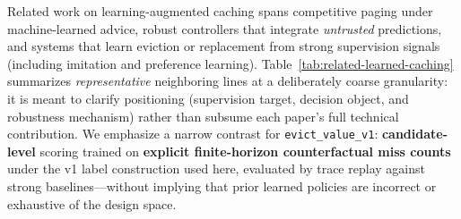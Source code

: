 Related work on learning-augmented caching spans competitive paging under machine-learned advice, robust controllers that integrate \emph{untrusted} predictions, and systems that learn eviction or replacement from strong supervision signals (including imitation and preference learning).
Table~\ref{tab:related-learned-caching} summarizes \emph{representative} neighboring lines at a deliberately coarse granularity: it is meant to clarify positioning (supervision target, decision object, and robustness mechanism) rather than subsume each paper's full technical contribution.
We emphasize a narrow contrast for \texttt{evict\_value\_v1}: \textbf{candidate-level} scoring trained on \textbf{explicit finite-horizon counterfactual miss counts} under the v1 label construction used here, evaluated by trace replay against strong baselines---without implying that prior learned policies are incorrect or exhaustive of the design space.
